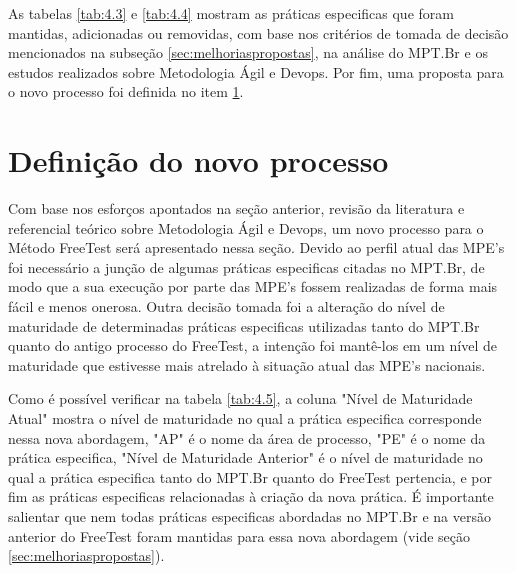 As tabelas \ref{tab:4.3} e \ref{tab:4.4} mostram as práticas especificas que foram mantidas, adicionadas ou removidas, com base nos critérios de tomada de decisão mencionados na subseção \ref{sec:melhoriaspropostas}, na análise do MPT.Br e os estudos realizados sobre Metodologia Ágil e Devops. Por fim, uma proposta para o novo processo foi definida no item \ref{sec:novoprocesso}.

\section{Definição do novo processo}
\label{sec:novoprocesso}

Com base nos esforços apontados na seção anterior, revisão da literatura e referencial teórico sobre Metodologia Ágil e Devops, um novo processo para o Método FreeTest será apresentado nessa seção. Devido ao perfil atual das MPE's foi necessário a junção de algumas práticas especificas citadas no MPT.Br, de modo que a sua execução por parte das MPE's fossem realizadas de forma mais fácil e menos onerosa. Outra decisão tomada foi a alteração do nível de maturidade de determinadas práticas especificas utilizadas tanto do MPT.Br quanto do antigo processo do FreeTest, a intenção foi mantê-los em um nível de maturidade que estivesse mais atrelado à situação atual das MPE's nacionais.

Como é possível verificar na tabela \ref{tab:4.5}, a coluna "Nível de Maturidade Atual" mostra o nível de maturidade no qual a prática especifica corresponde nessa nova abordagem, "AP" é o nome da área de processo, "PE" é o nome da prática especifica, "Nível de Maturidade Anterior" é o nível de maturidade no qual a prática especifica tanto do MPT.Br quanto do FreeTest pertencia, e por fim as práticas especificas relacionadas à criação da nova prática. É importante salientar que nem todas práticas especificas abordadas no MPT.Br e na versão anterior do FreeTest foram mantidas para essa nova abordagem (vide seção \ref{sec:melhoriaspropostas}).

